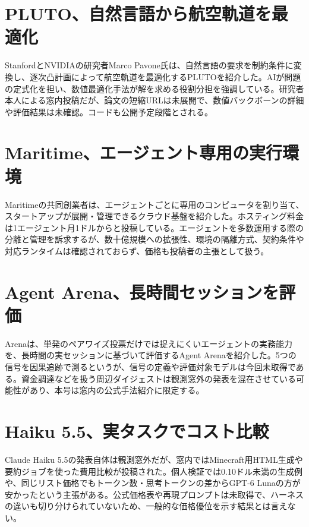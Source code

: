 \section{PLUTO、自然言語から航空軌道を最適化}
StanfordとNVIDIAの研究者Marco Pavone氏は、自然言語の要求を制約条件に変換し、逐次凸計画によって航空軌道を最適化するPLUTOを紹介した。AIが問題の定式化を担い、数値最適化手法が解を求める役割分担を強調している。研究者本人による窓内投稿だが、論文の短縮URLは未展開で、数値バックボーンの詳細や評価結果は未確認。コードも公開予定段階とされる。

\section{Maritime、エージェント専用の実行環境}
Maritimeの共同創業者は、エージェントごとに専用のコンピュータを割り当て、スタートアップが展開・管理できるクラウド基盤を紹介した。ホスティング料金は1エージェント月1ドルからと投稿している。エージェントを多数運用する際の分離と管理を訴求するが、数十億規模への拡張性、環境の隔離方式、契約条件や対応ランタイムは確認されておらず、価格も投稿者の主張として扱う。

\section{Agent Arena、長時間セッションを評価}
Arenaは、単発のペアワイズ投票だけでは捉えにくいエージェントの実務能力を、長時間の実セッションに基づいて評価するAgent Arenaを紹介した。5つの信号を因果追跡で測るというが、信号の定義や評価対象モデルは今回未取得である。資金調達などを扱う周辺ダイジェストは観測窓外の発表を混在させている可能性があり、本号は窓内の公式手法紹介に限定する。

\section{Haiku 5.5、実タスクでコスト比較}
Claude Haiku 5.5の発表自体は観測窓外だが、窓内ではMinecraft用HTML生成や要約ジョブを使った費用比較が投稿された。個人検証では0.10ドル未満の生成例や、同じリスト価格でもトークン数・思考トークンの差からGPT-6 Lunaの方が安かったという主張がある。公式価格表や再現プロンプトは未取得で、ハーネスの違いも切り分けられていないため、一般的な価格優位を示す結果とは言えない。

